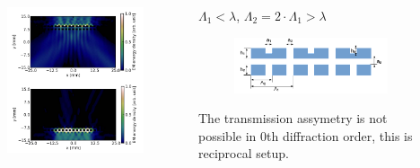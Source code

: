 \documentclass{beamer}
\begin{document}
\begin{frame}
	\begin{columns}
		\begin{column}{0.5\textwidth}
			\begin{figure}
				\includegraphics[width=\textwidth]{../images/dmg/letters_eneden.png}
			\end{figure}
		\end{column}
		\begin{column}{0.5\textwidth}
			$\Lambda_1 < \lambda$, $\Lambda_2 = 2 \cdot \Lambda_1 > \lambda$
			\begin{figure}
				\includegraphics[width=\textwidth]{../images/dmg/letters_schemat.png}
			\end{figure}
			The transmission assymetry is not possible in 0th diffraction order, this is reciprocal setup.
			
		\end{column}
	\end{columns}
	{\tiny \cite{Stolarek:13}}
		
\end{frame}
\end{document}
